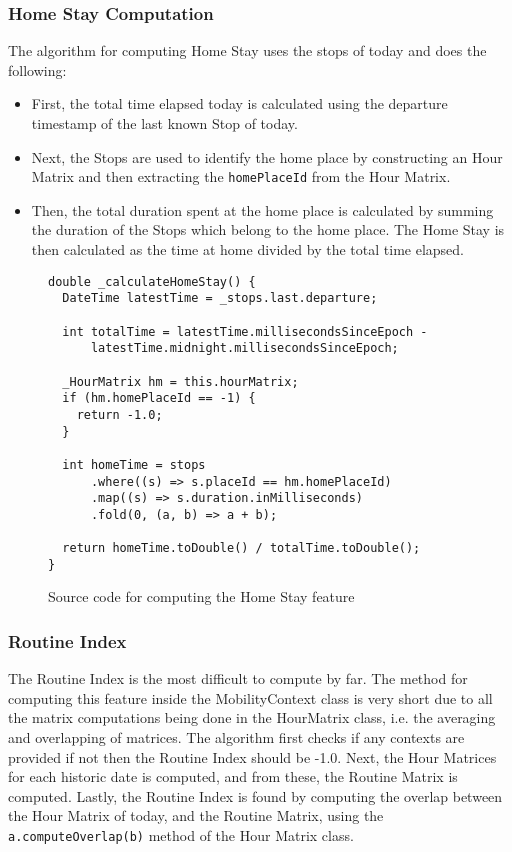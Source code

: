 \subsubsection*{Home Stay Computation}
The algorithm for computing Home Stay uses the stops of today and does the following: 

\begin{itemize}
    \item First, the total time elapsed today is calculated using the departure timestamp of the last known Stop of today. 
    \item Next, the Stops are used to identify the home place by constructing an Hour Matrix and then extracting the \verb|homePlaceId| from the Hour Matrix. 
    \item Then, the total duration spent at the home place is calculated by summing the duration of the Stops which belong to the home place. The Home Stay is then calculated as the time at home divided by the total time elapsed.
\end{itemize}

\begin{figure}[h]
    \centering
\begin{verbatim}
double _calculateHomeStay() {
  DateTime latestTime = _stops.last.departure;

  int totalTime = latestTime.millisecondsSinceEpoch -
      latestTime.midnight.millisecondsSinceEpoch;

  _HourMatrix hm = this.hourMatrix;
  if (hm.homePlaceId == -1) {
    return -1.0;
  }

  int homeTime = stops
      .where((s) => s.placeId == hm.homePlaceId)
      .map((s) => s.duration.inMilliseconds)
      .fold(0, (a, b) => a + b);

  return homeTime.toDouble() / totalTime.toDouble();
}
\end{verbatim}
    \caption{Source code for computing the Home Stay feature}
    \label{fig:home-stay-code}
\end{figure}

\subsubsection*{Routine Index}
The Routine Index is the most difficult to compute by far. The method for computing this feature inside the MobilityContext class is very short due to all the matrix computations being done in the HourMatrix class, i.e. the averaging and overlapping of matrices. The algorithm first checks if any contexts are provided if not then the Routine Index should be -1.0. Next, the Hour Matrices for each historic date is computed, and from these, the Routine Matrix is computed. Lastly, the Routine Index is found by computing the overlap between the Hour Matrix of today, and the Routine Matrix, using the \verb|a.computeOverlap(b)| method of the Hour Matrix class.

